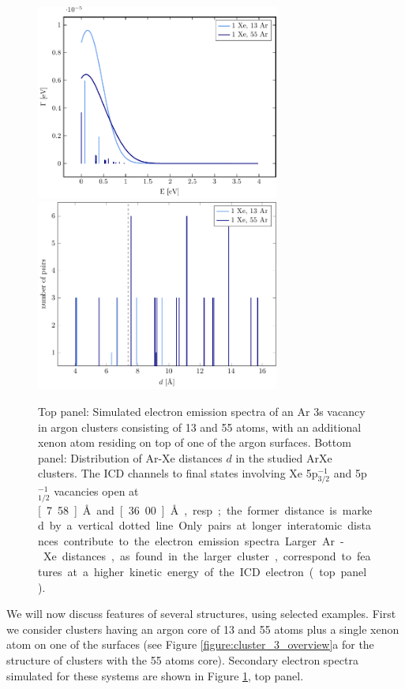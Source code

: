 \documentclass[journal=jpccck,manuscript=article]{achemso}
\begin{document}
\begin{figure}[H]
 \centering
 \includegraphics[width=8.0cm]{surf.pdf}\\
 \includegraphics[width=8.0cm]{R_comp.pdf}
 \caption{
 Top panel: Simulated electron emission spectra of an Ar 3s vacancy in 
          argon clusters
          consisting of 13 and 55 atoms, with an additional xenon atom residing
          on top of one of the argon surfaces.
          Bottom panel: Distribution of Ar-Xe distances $d$ in the studied ArXe
          clusters. The ICD channels to final states involving Xe 5p$_{3/2}^{-1}$ and 
          5p$_{1/2}^{-1}$ vacancies open at \unit[7.58]{\AA} and
          \unit[36.00]{\AA}, resp.; the former distance is marked by a vertical dotted line. 
          Only pairs at longer interatomic
          distances contribute to the electron emission spectra.
          Larger Ar-Xe distances, as found in the larger cluster,
          correspond to features at a higher kinetic energy of
          the ICD electron (top panel).}
 \label{figure:surf}
\end{figure}


We will now discuss features of several structures, using selected examples.
First we consider clusters having an argon core of 13 and 55 atoms plus a single xenon
atom on one of the surfaces (see Figure \ref{figure:cluster_3_overview}a
for the structure of clusters with the 55 atoms core).
Secondary electron spectra simulated for these systems are shown in Figure \ref{figure:surf}, top panel.
\end{document}
